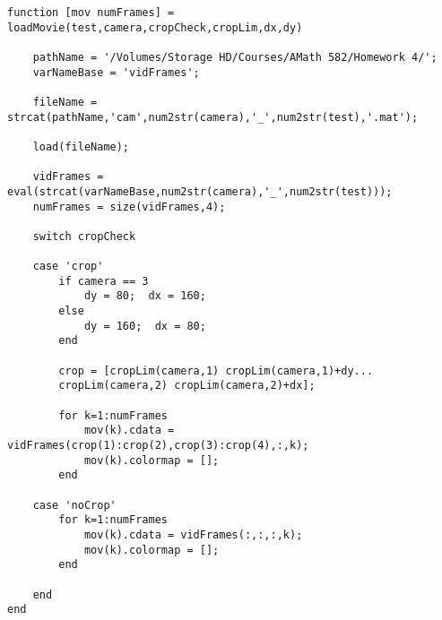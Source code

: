 \begin{verbatim}
function [mov numFrames] = loadMovie(test,camera,cropCheck,cropLim,dx,dy)
	
    pathName = '/Volumes/Storage HD/Courses/AMath 582/Homework 4/';
    varNameBase = 'vidFrames';

    fileName = strcat(pathName,'cam',num2str(camera),'_',num2str(test),'.mat');

    load(fileName);
	
    vidFrames = eval(strcat(varNameBase,num2str(camera),'_',num2str(test)));
    numFrames = size(vidFrames,4);
	
    switch cropCheck
    
    case 'crop'		
        if camera == 3
            dy = 80;  dx = 160;
        else
            dy = 160;  dx = 80;
        end
		
        crop = [cropLim(camera,1) cropLim(camera,1)+dy...
        cropLim(camera,2) cropLim(camera,2)+dx];
    
        for k=1:numFrames
            mov(k).cdata = vidFrames(crop(1):crop(2),crop(3):crop(4),:,k);
            mov(k).colormap = [];
        end
		
    case 'noCrop'		
        for k=1:numFrames
            mov(k).cdata = vidFrames(:,:,:,k);
            mov(k).colormap = [];
        end
		
    end
end
\end{verbatim}